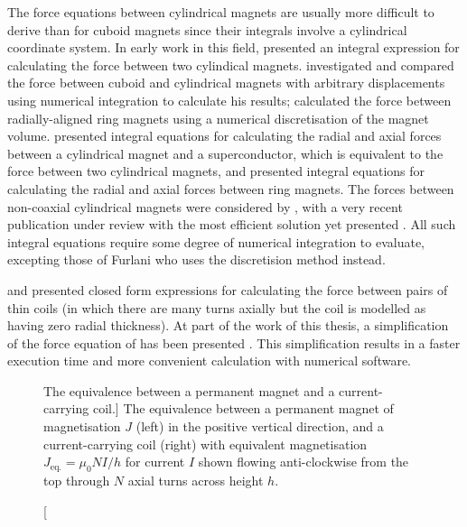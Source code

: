 \documentclass[11pt,a4paper]{memoir}
\begin{document}
The force equations between cylindrical magnets are usually more difficult to derive than for cuboid magnets since their integrals involve a cylindrical coordinate system.
In early work in this field, \textcite{cooper1973-ietm} presented an integral expression for calculating the force between two cylindical magnets.
\textcite{nagaraj1988} investigated and compared the force between cuboid and cylindrical magnets with arbitrary displacements using numerical integration to calculate his results; \textcite{furlani1993-ietm,furlani1993-ietm-coupl} calculated the force between radially-aligned ring magnets using a numerical discretisation of the magnet volume.
\textcite{hull1999-japplphys} presented integral equations for calculating the radial and axial forces between a cylindrical magnet and a superconductor, which is equivalent to the force between two cylindrical magnets, and \textcite{bassani2006-trib-int} presented integral equations for calculating the radial and axial forces between ring magnets.
The forces between non-coaxial cylindrical magnets were considered by \textcite{agashe2008-applphys,vokoun2009-jmmm}, with a very recent publication under review with the most efficient solution yet presented \cite{conway2013-ietm}.
All such integral equations require some degree of numerical integration to evaluate, excepting those of Furlani who uses the discretision method instead.

\textcite{babic2008-ietm} and \textcite{ravaud2010-pier} presented closed form expressions for calculating the force between pairs of thin coils (in which there are many turns axially but the coil is modelled as having zero radial thickness).
At part of the work of this thesis, a simplification of the force equation of \textcite{ravaud2010-pier} has been presented \cite{robertson2011-ietm}.
This simplification results in a faster execution time and more convenient calculation with numerical software.


\begin{figure}
\centering
{}
\caption
[The equivalence between a permanent magnet and a current-carrying coil.]
{The equivalence between a permanent magnet of magnetisation $J$ (left) in the positive vertical direction, and a current-carrying coil (right) with equivalent magnetisation $J_{\text{eq.}}=\mu_0 N I/h$ for current $I$ shown flowing anti-clockwise from the top through $N$ axial turns across height $h$.}
\end{figure}
\end{document}
